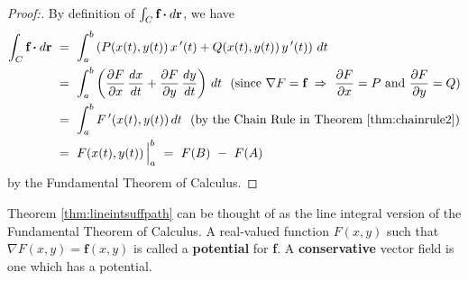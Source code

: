 \begin{proofbar}\vspace{-3mm}\begin{proof}[Proof:]
 By definition of $\int_{C} \textbf{f} \bm{\cdot} d\textbf{r}$, we have
 \begin{align*}
  \int_{C} \textbf{f} \bm{\cdot} d\textbf{r} ~&=~ \int_a^b \left( P(x(t),y(t))\,x\,'(t) + Q(x(t),y(t))\,y\,'(t) \right)\,dt\\
   &=~ \int_a^b \left( \frac{\partial F}{\partial x}\,\frac{dx}{dt} + \frac{\partial F}{\partial y}\,\frac{dy}{dt}
   \right)\,dt ~~\text{(since $\nabla F = \textbf{f} ~\Rightarrow~ \frac{\partial F}{\partial x} = P$ and
   $\frac{\partial F}{\partial y} = Q$)}\\
   &=~ \int_a^b F\,'(x(t),y(t))\,dt ~~\text{(by the Chain Rule in Theorem \ref{thm:chainrule2})}\\
   &=~ F(x(t),y(t)) \,\Big|_a^b ~=~ F(B) ~-~ F(A)
 \end{align*}
 by the Fundamental Theorem of Calculus.
 \vspace{-3mm}
\end{proof}\end{proofbar}
\newpage
Theorem \ref{thm:lineintsuffpath} can be thought of as the line integral version of the Fundamental Theorem of
Calculus. A real-valued function $F(x,y)$ such that $\nabla F(x,y) = \textbf{f}(x,y)$ is called a \textbf{potential}
for \textbf{f}. A \textbf{conservative} vector field is one which has a potential.

